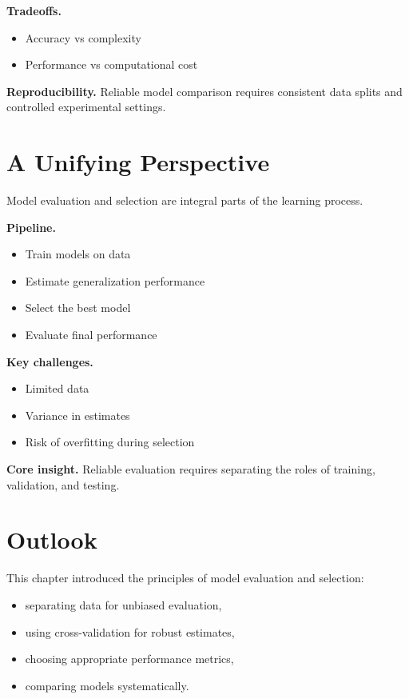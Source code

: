 \medskip

\noindent
\textbf{Tradeoffs.}
\begin{itemize}
    \item Accuracy vs complexity
    \item Performance vs computational cost
\end{itemize}

\medskip

\noindent
\textbf{Reproducibility.}  
Reliable model comparison requires consistent data splits and controlled experimental settings.

\section{A Unifying Perspective}

Model evaluation and selection are integral parts of the learning process.

\medskip

\noindent
\textbf{Pipeline.}
\begin{itemize}
    \item Train models on data
    \item Estimate generalization performance
    \item Select the best model
    \item Evaluate final performance
\end{itemize}

\medskip

\noindent
\textbf{Key challenges.}
\begin{itemize}
    \item Limited data
    \item Variance in estimates
    \item Risk of overfitting during selection
\end{itemize}

\medskip

\noindent
\textbf{Core insight.}  
Reliable evaluation requires separating the roles of training, validation, and testing.

\section{Outlook}

This chapter introduced the principles of model evaluation and selection:
\begin{itemize}
    \item separating data for unbiased evaluation,
    \item using cross-validation for robust estimates,
    \item choosing appropriate performance metrics,
    \item comparing models systematically.
\end{itemize}


